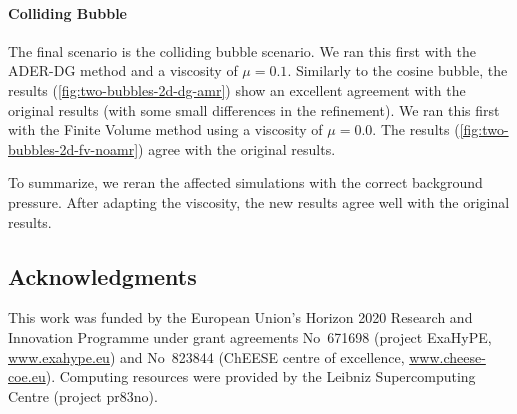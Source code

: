\documentclass[runningheads]{llncs}
\begin{document}
\paragraph{Colliding Bubble}
The final scenario is the colliding bubble scenario.
We ran this first with the ADER-DG method and a viscosity of $\mu=0.1$.
Similarly to the cosine bubble, the results (\cref{fig:two-bubbles-2d-dg-amr}) show an excellent agreement with the original results (with some small differences in the refinement).
We ran this first with the Finite Volume method using a viscosity of $\mu=0.0$.
The results (\cref{fig:two-bubbles-2d-fv-noamr}) agree with the original results.

To summarize, we reran the affected simulations with the correct background pressure.
After adapting the viscosity, the new results agree well with the original results.

\subsection*{Acknowledgments}
This work was funded by the European Union’s Horizon 2020 Research and Innovation Programme under grant agreements 
No~671698 (project ExaHyPE, \url{www.exahype.eu}) and 
No~823844 (ChEESE centre of excellence, \url{www.cheese-coe.eu}).
Computing resources were provided by the Leibniz Supercomputing Centre (project pr83no).


{}
\end{document}
